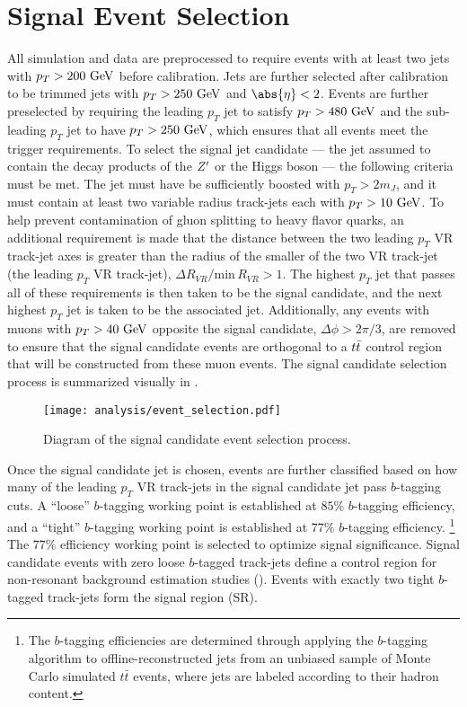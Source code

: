 \section{Signal Event Selection}\label{sec:event_selection}

All simulation and data are preprocessed to require events with at least two \largeR{} jets with $p_{T} > 200~\mathrm{GeV}$ before calibration.
Jets are further selected after calibration to be trimmed \largeR{} jets with $p_{T} > 250~\mathrm{GeV}$ and $\abs{\eta} < 2$.
Events are further preselected by requiring the leading $p_{T}$ \largeR{} jet to satisfy $p_{T} > 480~\mathrm{GeV}$ and the sub-leading $p_{T}$ \largeR{} jet to have $p_{T} > 250~\mathrm{GeV}$, which ensures that all events meet the trigger requirements.
To select the signal jet candidate --- the \largeR{} jet assumed to contain the decay products of the $Z'$ or the Higgs boson --- the following criteria must be met.
The \largeR{} jet must have be sufficiently boosted with $p_{T} > 2m_{J}$, and it must contain at least two variable radius track-jets each with $p_{T} > 10~\mathrm{GeV}$.
To help prevent contamination of gluon splitting to heavy flavor quarks, an additional requirement is made that the distance between the two leading $p_{T}$ VR track-jet axes is greater than the radius of the smaller of the two VR track-jet (the leading $p_{T}$ VR track-jet), $\Delta R_{VR}/\mathrm{min\,} R_{VR} > 1$.
The highest $p_{T}$ \largeR{} jet that passes all of these requirements is then taken to be the signal candidate, and the next highest $p_{T}$ \largeR{} jet is taken to be the associated jet.
Additionally, any events with muons with $p_{T} > 40~\mathrm{GeV}$ opposite the signal candidate, $\Delta \phi > 2\pi/3$, are removed to ensure that the signal candidate events are orthogonal to a $t\bar{t}$ control region that will be constructed from these muon events.
The signal candidate selection process is summarized visually in .

\begin{figure}[htbp]
 \centering
 \texttt{[image: analysis/event\_selection.pdf]}
 \caption[Diagram of the signal candidate event selection process.]{%
  Diagram of the signal candidate event selection process.}
 \label{fig:event_selection}
\end{figure}

Once the signal candidate jet is chosen, events are further classified based on how many of the leading $p_{T}$ VR track-jets in the signal candidate \largeR{} jet pass $b$-tagging cuts.
A ``loose'' $b$-tagging working point is established at $85\%$ $b$-tagging efficiency, and a ``tight'' $b$-tagging working point is established at $77\%$ $b$-tagging efficiency.%
\footnote{The $b$-tagging efficiencies are determined through applying the $b$-tagging algorithm to offline-reconstructed jets from an unbiased sample of Monte Carlo simulated $t\bar{t}$ events, where jets are labeled according to their hadron content.}
The $77\%$ efficiency working point is selected to optimize signal significance.
Signal candidate events with zero loose $b$-tagged track-jets define a control region for non-resonant background estimation studies (\CRQCD).
Events with exactly two tight $b$-tagged track-jets form the signal region (SR).

